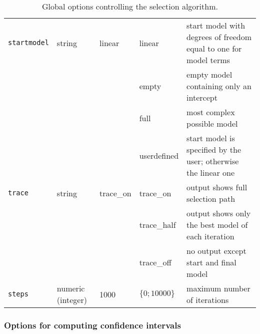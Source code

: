 \begin{table}[ht]
\begin{center}
\begin{tabular}{|p{2.2cm}|p{1.3cm}|p{1.5cm}|p{1.6cm}|p{7.4cm}|}
\hline
{\tt startmodel} & string  & linear    & linear      & start model with degrees of freedom equal to one for model terms \\
                 &         &           & empty       & empty model containing only an intercept  \\
                 &         &           & full        & most complex possible model \\
                 &         &           & userdefined & start model is specified by the user; \newline
                                                       otherwise the linear one \\
\hline
{\tt trace}      & string  & trace\_on & trace\_on   & output shows full selection path \\
                 &         &           & trace\_half & output shows only the best model of each iteration \\
                 &         &           & trace\_off  & no output except start and final model \\
\hline
{\tt steps}      & numeric \newline (integer) & 1000 & $\{0;10000\}$ & maximum number of iterations \\
\hline
\end{tabular}
{\em\caption {\label{stewpisereg_globaloptions} Global options controlling the selection algorithm.}}
\end{center}
\end{table}


\subsubsection*{Options for computing confidence intervals}
\label{stepwise_options_ci}

